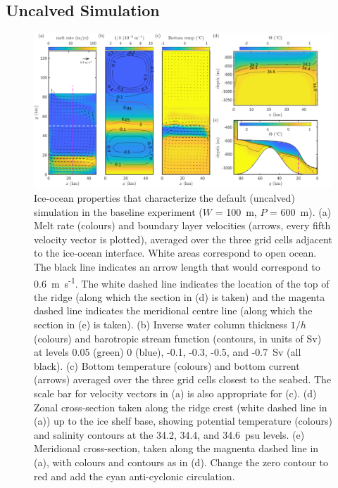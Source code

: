 \documentclass[draft]{agujournal2019}
\begin{document}
\subsection{Uncalved Simulation}\label{S:Baseline:Default}
\begin{figure}
    \centering
    \includegraphics[width = \textwidth]{../make_figures/plots/figure3-with-arrow.pdf}
    \caption{Ice-ocean properties that characterize the default (uncalved) simulation in the baseline experiment ($W$ = 100~m, $P$ = 600~m). (a) Melt rate (colours) and boundary layer velocities (arrows, every fifth velocity vector is plotted), averaged over the three grid cells adjacent to the ice-ocean interface. White areas correspond to open ocean. The black line indicates an arrow length that would correspond to 0.6~m~s\textsuperscript{-1}. The white dashed line indicates the location of the top of the ridge (along which the section in (d) is taken) and the magenta dashed line indicates the meridional centre line (along which the section in (e) is taken). (b) Inverse water column thickness $1/h$ (colours) and barotropic stream function (contours, in units of Sv) at levels 0.05 (green) 0 (blue), -0.1, -0.3, -0.5, and -0.7~Sv (all black). (c) Bottom temperature (colours) and bottom current (arrows) averaged over the three grid cells closest to the seabed. The scale bar for velocity vectors in (a) is also appropriate for (c). (d) Zonal cross-section taken along the ridge crest (white dashed line in (a)) up to the ice shelf base, showing potential temperature (colours) and salinity contours at the 34.2, 34.4, and 34.6~psu levels. (e) Meridional cross-section, taken along the magnenta dashed line in (a), with colours and contours as in (d). Change the zero contour to red and add the cyan anti-cyclonic circulation.}
    \label{fig:figure3}
\end{figure}
\end{document}
